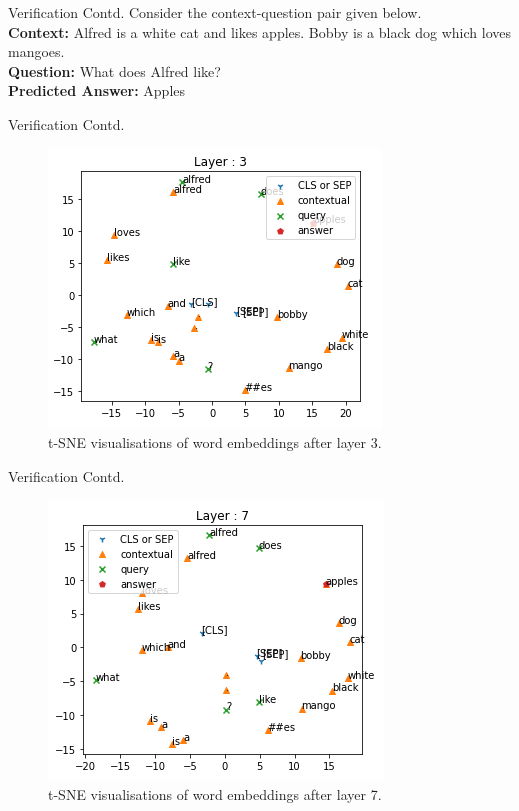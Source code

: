\documentclass[10pt]{beamer}
\begin{document}
\begin{frame}{Verification Contd.}
Consider the context-question pair given below.\\
\textbf{Context: }Alfred is a white cat and likes apples. Bobby is a black dog which loves mangoes.\\
\textbf{Question: }What does Alfred like?\\
\textbf{Predicted Answer: }Apples
\end{frame}

\begin{frame}{Verification Contd.}
\begin{figure}
    \includegraphics[scale = 0.5]{layer_3.png}
    \caption{t-SNE visualisations of word embeddings after layer 3.}
    \label{fig:plot2}
\end{figure}
\end{frame}

\begin{frame}{Verification Contd.}
\begin{figure}
    \includegraphics[scale=0.5]{layer_7.png}
    \caption{t-SNE visualisations of word embeddings after layer 7.}
\end{figure}
\end{frame}
\end{document}
